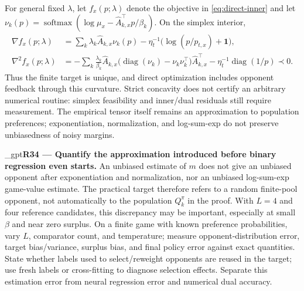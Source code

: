 \documentclass{article}
\newif\ifshowreviews
\newcommand{\reviewresponse}[1]{%
  \ifshowreviews
  \par\begingroup\color{blue!65!black}\hypersetup{allcolors=blue!65!black}\emergencystretch=2em%
  \noindent\textbf{Response:} #1\par\endgroup
  \fi}
\theoremstyle{remark}
\theoremstyle{plain}
\begin{document}
For general fixed $\lambda$, let $f_x(p;\lambda)$ denote the objective in \eqref{eq:direct-inner} and let
$\nu_k(p)=\operatorname{softmax}(\log\mu_x-\widehat A_{k,x}^{\top}p/\beta_k)$. On the simplex interior,
\begin{align*}
\nabla f_x(p;\lambda)
&=\sum_k\lambda_k\widehat A_{k,x}\nu_k(p)
-\eta_t^{-1}\bigl(\log(p/p_{t,x})+\mathbf1\bigr),\\
\nabla^2 f_x(p;\lambda)
&=-\sum_k\frac{\lambda_k}{\beta_k}\widehat A_{k,x}
\bigl(\operatorname{diag}(\nu_k)-\nu_k\nu_k^\top\bigr)\widehat A_{k,x}^\top
-\eta_t^{-1}\operatorname{diag}(1/p)\prec0.
\end{align*}
Thus the finite target is unique, and direct optimization includes opponent feedback through this curvature. Strict concavity does not certify an arbitrary numerical routine: simplex feasibility and inner/dual residuals still require measurement. The empirical tensor itself remains an approximation to population preferences; exponentiation, normalization, and log-sum-exp do not preserve unbiasedness of noisy margins.


\kekim_gpt{\textbf{R34 --- Quantify the approximation introduced before binary regression even starts.} An unbiased estimate of $m$ does not give an unbiased opponent after exponentiation and normalization, nor an unbiased log-sum-exp game-value estimate. The practical target therefore refers to a random finite-pool opponent, not automatically to the population $Q_k^\pi$ in the proof. With $L=4$ and four reference candidates, this discrepancy may be important, especially at small $\beta$ and near zero surplus. On a finite game with known preference probabilities, vary $L$, comparator count, and temperature; measure opponent-distribution error, target bias/variance, surplus bias, and final policy error against exact quantities. State whether labels used to select/reweight opponents are reused in the target; use fresh labels or cross-fitting to diagnose selection effects. Separate this estimation error from neural regression error and numerical dual accuracy.}
\reviewresponse{\textbf{R34 --- Partially addressed.} The implementation now defines a finite-pool teacher explicitly and acknowledges that exponentiation, normalization, and log-sum-exp do not preserve unbiasedness of noisy margins. It separates numerical solver accuracy from sampling and neural errors, but the requested sampling-count, comparator-count, temperature, and label-reuse or cross-fitting error audit remains pending.}
\end{document}
